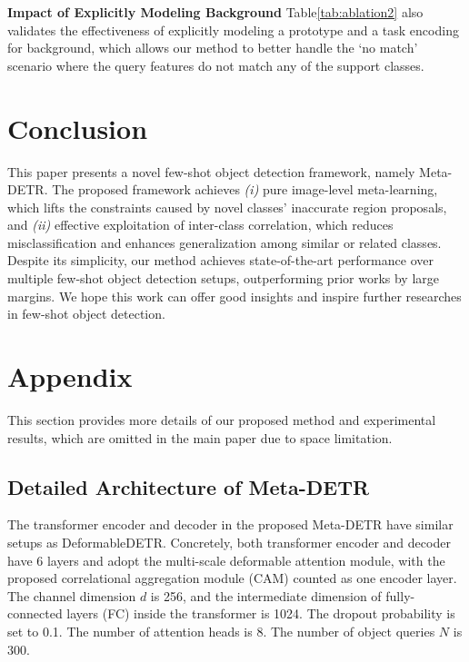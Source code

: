 \documentclass[letterpaper]{article} \usepackage{aaai22}  \usepackage{times}  \usepackage{helvet}  \usepackage{courier}  \usepackage[hyphens]{url}  \usepackage{graphicx} \urlstyle{rm} \def\UrlFont{\rm}  \usepackage{natbib}  \usepackage{caption} \DeclareCaptionStyle{ruled}{labelfont=normalfont,labelsep=colon,strut=off} \frenchspacing  \setlength{\pdfpagewidth}{8.5in}  \setlength{\pdfpageheight}{11in}  \usepackage{algorithm}
\begin{document}
\smallskip
\vspace{+0.5mm}
\noindent\textbf{Impact of Explicitly Modeling Background\;\;}
Table\;\ref{tab:ablation2} also validates the effectiveness of explicitly modeling a prototype and a task encoding for background, which allows our method to better handle the `no match' scenario where the query features do not match any of the support classes.





\section{Conclusion}

This paper presents a novel few-shot object detection framework, namely Meta-DETR. The proposed framework achieves \textit{(i)} pure image-level meta-learning, which lifts the constraints caused by novel classes' inaccurate region proposals, and \textit{(ii)} effective exploitation of inter-class correlation, which reduces misclassification and enhances generalization among similar or related classes. Despite its simplicity, our method achieves state-of-the-art performance over multiple few-shot object detection setups, outperforming prior works by large margins. We hope this work can offer good insights and inspire further researches in few-shot object detection.

\clearpage
{

}



\clearpage

\section{Appendix}

This section provides more details of our proposed method and experimental results, which are omitted in the main paper due to space limitation. 

\subsection{Detailed Architecture of Meta-DETR}

The transformer encoder and decoder in the proposed Meta-DETR have similar setups as Deformable\;DETR\;\cite{DeformableDETR}. Concretely, both transformer encoder and decoder have 6 layers and adopt the multi-scale deformable attention module, with the proposed correlational aggregation module (CAM) counted as one encoder layer. The channel dimension $d$ is 256, and the intermediate dimension of fully-connected layers (FC) inside the transformer is 1024. The dropout probability is set to 0.1. The number of attention heads is 8. The number of object queries $N$ is 300.
\end{document}
